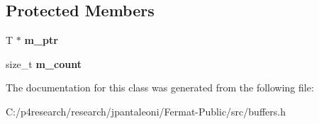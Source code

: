 \subsection*{Protected Members}
\begin{DoxyCompactItemize}
\item 
\mbox{\label{class_managed_buffer_afa1c73ffe02ba7ea921ae0c4269dde24}} 
T $\ast$ {\bfseries m\+\_\+ptr}
\item 
\mbox{\label{class_managed_buffer_a919e3d39f6358a9a52d7fa01011d95ba}} 
size\+\_\+t {\bfseries m\+\_\+count}
\end{DoxyCompactItemize}


The documentation for this class was generated from the following file\+:\begin{DoxyCompactItemize}
\item 
C\+:/p4research/research/jpantaleoni/\+Fermat-\/\+Public/src/buffers.\+h\end{DoxyCompactItemize}
